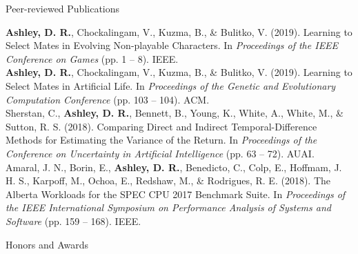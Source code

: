 \documentclass{cv}
\begin{document}
\begin{rSection}{Peer-reviewed Publications}

{\bf Ashley, D. R.}, Chockalingam, V., Kuzma, B., \& Bulitko, V. (2019). Learning to Select Mates in Evolving Non-playable Characters. In {\em Proceedings of the IEEE Conference on Games} (pp. 1 -- 8). IEEE. \vspace{0.5em}\\
{\bf Ashley, D. R.}, Chockalingam, V., Kuzma, B., \& Bulitko, V. (2019). Learning to Select Mates in Artificial Life. In {\em Proceedings of the Genetic and Evolutionary Computation Conference} (pp. 103 -- 104). ACM. \vspace{0.5em}\\
Sherstan, C., {\bf Ashley, D. R.}, Bennett, B., Young, K., White, A., White, M., \& Sutton, R. S. (2018). Comparing Direct and Indirect Temporal-Difference Methods for Estimating the Variance of the Return. In {\em Proceedings of the Conference on Uncertainty in Artificial Intelligence} (pp. 63 -- 72). AUAI. \vspace{0.5em}\\
Amaral, J. N., Borin, E., {\bf Ashley, D. R.}, Benedicto, C., Colp, E., Hoffmam, J. H. S., Karpoff, M., Ochoa, E., Redshaw, M., \& Rodrigues, R. E. (2018). The Alberta Workloads for the SPEC CPU 2017 Benchmark Suite. In {\em Proceedings of the IEEE International Symposium on Performance Analysis of Systems and Software} (pp. 159 -- 168). IEEE.

\end{rSection}


\begin{rSection}{Honors and Awards}

 \vspace{0.15em}\\
 \vspace{0.15em}\\
 \vspace{0.15em}\\
 \vspace{0.15em}\\
 \vspace{0.15em}\\
 \vspace{0.15em}\\
 \vspace{0.05em}

\end{rSection}
\end{document}
